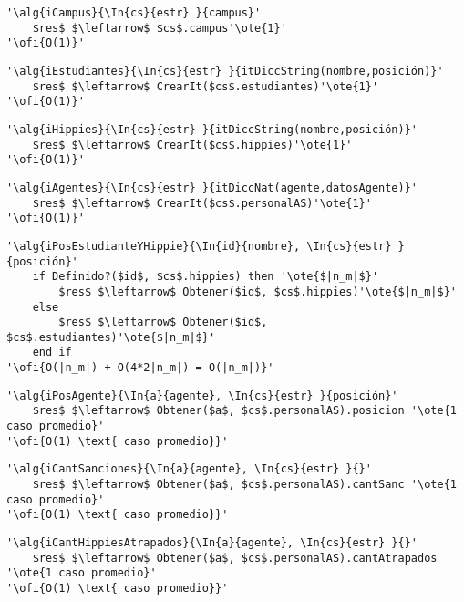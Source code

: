 \begin{lstlisting}[mathescape]
'\alg{iCampus}{\In{cs}{estr} }{campus}'
	$res$ $\leftarrow$ $cs$.campus'\ote{1}'
'\ofi{O(1)}'
\end{lstlisting}

\begin{lstlisting}[mathescape]
'\alg{iEstudiantes}{\In{cs}{estr} }{itDiccString(nombre,posición)}'
	$res$ $\leftarrow$ CrearIt($cs$.estudiantes)'\ote{1}'
'\ofi{O(1)}'
\end{lstlisting}

\begin{lstlisting}[mathescape]
'\alg{iHippies}{\In{cs}{estr} }{itDiccString(nombre,posición)}'
	$res$ $\leftarrow$ CrearIt($cs$.hippies)'\ote{1}'
'\ofi{O(1)}'
\end{lstlisting}

\begin{lstlisting}[mathescape]
'\alg{iAgentes}{\In{cs}{estr} }{itDiccNat(agente,datosAgente)}'
	$res$ $\leftarrow$ CrearIt($cs$.personalAS)'\ote{1}'
'\ofi{O(1)}'
\end{lstlisting}

\begin{lstlisting}[mathescape]
'\alg{iPosEstudianteYHippie}{\In{id}{nombre}, \In{cs}{estr} }{posición}'
	if Definido?($id$, $cs$.hippies) then '\ote{$|n_m|$}'
		$res$ $\leftarrow$ Obtener($id$, $cs$.hippies)'\ote{$|n_m|$}'
	else
		$res$ $\leftarrow$ Obtener($id$, $cs$.estudiantes)'\ote{$|n_m|$}'
	end if
'\ofi{O(|n_m|) + O(4*2|n_m|) = O(|n_m|)}'
\end{lstlisting}

\begin{lstlisting}[mathescape]
'\alg{iPosAgente}{\In{a}{agente}, \In{cs}{estr} }{posición}'
	$res$ $\leftarrow$ Obtener($a$, $cs$.personalAS).posicion '\ote{1 caso promedio}'
'\ofi{O(1) \text{ caso promedio}}'
\end{lstlisting}

\begin{lstlisting}[mathescape]
'\alg{iCantSanciones}{\In{a}{agente}, \In{cs}{estr} }{}'
	$res$ $\leftarrow$ Obtener($a$, $cs$.personalAS).cantSanc '\ote{1 caso promedio}'
'\ofi{O(1) \text{ caso promedio}}'
\end{lstlisting}

\begin{lstlisting}[mathescape]
'\alg{iCantHippiesAtrapados}{\In{a}{agente}, \In{cs}{estr} }{}'
	$res$ $\leftarrow$ Obtener($a$, $cs$.personalAS).cantAtrapados '\ote{1 caso promedio}'
'\ofi{O(1) \text{ caso promedio}}'
\end{lstlisting}

